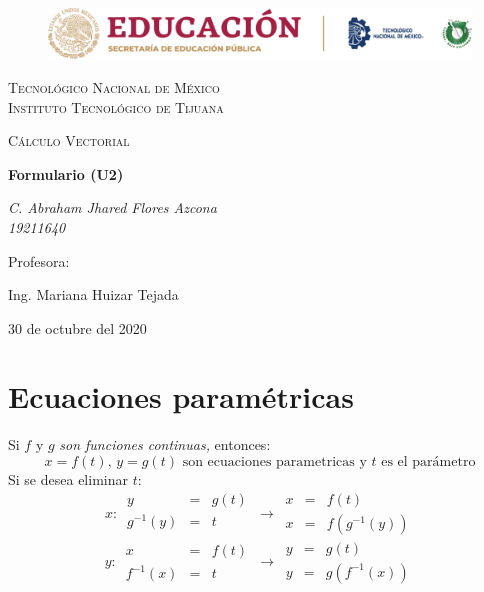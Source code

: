 \documentclass[letterpaper, 12pt]{article}
\begin{document}
        \begin{titlepage}
            \begin{figure}[ht]
                \centering
                \includegraphics[width=15cm]{logosITT.png}
            \end{figure}
            \centering
            {\scshape\LARGE Tecnológico Nacional de México\\Instituto Tecnológico de Tijuana\par}
            \vspace{1cm}
            {\scshape\Large Cálculo Vectorial\par}
            \vspace{1.5cm}
            {\huge\bfseries Formulario (U2)\par}
            \vspace{2cm}
            {\Large\itshape C. Abraham Jhared Flores Azcona\\19211640\par}
            \vfill
            Profesora: \par
            Ing. Mariana Huizar Tejada
            
            \vfill
    
            {\large 30 de octubre del 2020}
        \end{titlepage}
    
        \newpage
        \thispagestyle{empty}
        \tableofcontents
    
        \newpage
        \setcounter{page}{1}
        \thispagestyle{fancy}
        \section{Ecuaciones paramétricas}
        Si \(f\) y \(g\) \emph{son funciones continuas,} entonces:
        \[x=f(t),\, y=g(t) \text{ son ecuaciones parametricas y } t \text{ es el parámetro}\]
        Si se desea eliminar \(t\):
        \[x:\,\begin{matrix}
            y&=&g(t)\\
            g^{-1}(y)&=&t\\
        \end{matrix}\,\rightarrow\,\begin{matrix}
            x&=&f(t)\\
            x&=&f(g^{-1}(y))
        \end{matrix}\]
        \[y:\,\begin{matrix}
            x&=&f(t)\\
            f^{-1}(x)&=&t
        \end{matrix}\,\rightarrow\,\begin{matrix}
            y&=&g(t)\\
            y&=&g(f^{-1}(x))
        \end{matrix}\]
\end{document}
